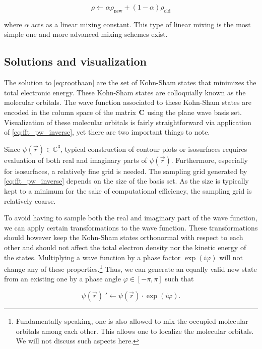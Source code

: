 \begin{equation}
    \rho \leftarrow \alpha \rho_{\text{new}} + (1 - \alpha) \rho_{\text{old}}
\end{equation}

where $\alpha$ acts as a linear mixing constant. This type of linear mixing is the most simple one and more advanced mixing schemes exist.

%
%
%
\subsection{Solutions and visualization}

The solution to \cref{eq:roothaan} are the set of Kohn-Sham states that minimizes the total electronic energy. These Kohn-Sham states are colloquially known as the molecular orbitals. The wave function associated to these Kohn-Sham states are encoded in the column space of the matrix $\mathbf{C}$ using the plane wave basis set. Visualization of these molecular orbitals is fairly straightforward via application of \cref{eq:fft_pw_inverse}, yet there are two important things to note.

Since $\psi(\vec{r}) \in \mathbb{C}^{3}$, typical construction of contour plots or isosurfaces requires evaluation of both real and imaginary parts of $\psi(\vec{r})$. Furthermore, especially for isosurfaces, a relatively fine grid is needed. The sampling grid generated by \cref{eq:fft_pw_inverse} depends on the size of the basis set. As the size is typically kept to a minimum for the sake of computational efficiency, the sampling grid is relatively coarse.

To avoid having to sample both the real and imaginary part of the wave function, we can apply certain transformations to the wave function. These transformations should however keep the Kohn-Sham states orthonormal with respect to each other and should not affect the total electron density nor the kinetic energy of the states. Multiplying a wave function by a phase factor $\exp(i\varphi)$ will not change any of these properties.\footnote{Fundamentally speaking, one is also allowed to mix the occupied molecular orbitals among each other. This allows one to localize the molecular orbitals. We will not discuss such aspects here.} Thus, we can generate an equally valid new state from an existing one by a phase angle $\varphi \in [-\pi,\pi]$ such that

\begin{equation}
    \psi(\vec{r})\; \prime \leftarrow \psi(\vec{r}) \cdot \exp \left(i \varphi \right).
    \label{eq:psi_transform}
\end{equation}

